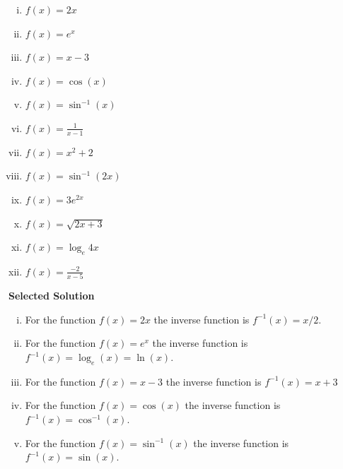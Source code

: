 \documentclass[]{article}
\begin{document}
\begin{multicols}{2}
	\begin{enumerate}[(i)]
\item	$f(x) = 2x$
\item	$f(x) =e^x$
\item	$f(x) = x-3$
	
\item	$f(x) =\cos(x)$
\item	$f(x) = \sin^{-1}(x)$
\item  ${f(x) = \displaystyle \frac{1}{x-1}}$
	
\item	$f(x) = x^2+2$
\item	$f(x) = \sin^{-1}(2x)$
\item	$f(x) = 3 e^{2x}$
\item $f(x) = \sqrt{2x+3}$
\item $f(x) = \log_e{4x}$
\item $ \displaystyle f(x) = \frac{-2}{x-5}$
	\end{enumerate}	
	\smallskip
\end{multicols}
\noindent \textbf{Selected Solution}
	\begin{enumerate}[(i)]
		\item For the function $f(x) = 2x$ the inverse function is $f^{-1}(x) = x/2$.
		\item For the function	$f(x) =e^x$ the inverse function is  $f^{-1}(x) = \log_e(x) = \ln(x)$.
		\item For the function	$f(x) = x-3$ the inverse function is $f^{-1}(x) = x+3$
		
		\item For the function	$f(x) =\cos(x)$ the inverse function is $f^{-1}(x) = \cos^{-1}(x)$.
		\item For the function	$f(x) = \sin^{-1}(x)$ the inverse function is $f^{-1}(x) = \sin(x)$.
		
	
\end{enumerate}
\newpage
\end{document}
